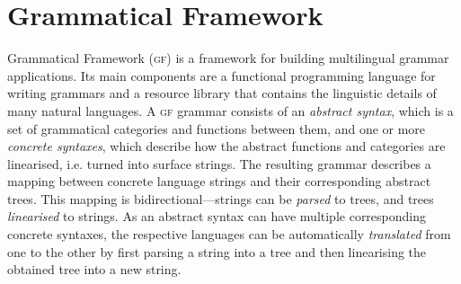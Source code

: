 \documentclass[11pt]{article}
\def\gf{\textsc{gf}}
\newcommand{\todo}[1]{{\color{cyan}\textbf{[TODO: }#1\textbf{]}}}
\begin{document}
\section{Grammatical Framework}
Grammatical Framework (\gf) \cite{ranta2004gf} 
is a framework for building multilingual grammar applications. Its main
components are a functional programming language for writing grammars
and a resource library \cite{ranta2009rgl} that contains the
linguistic details of many natural languages. A \gf{} grammar consists
of an \emph{abstract syntax}, which is a set of grammatical categories and
functions between them, and one or more \emph{concrete
  syntaxes}, which describe how the abstract functions and categories
are linearised, i.e. turned into surface strings. The resulting
grammar describes a mapping between concrete language strings and
their corresponding abstract trees. This mapping is
bidirectional---strings can be \emph{parsed} to trees, and trees
\emph{linearised} to strings. As an abstract syntax can have multiple
corresponding concrete syntaxes, the respective languages can be
automatically \emph{translated} from one to the other by first parsing
a string into a tree and then linearising the obtained tree into a new
string. 






\end{document}
